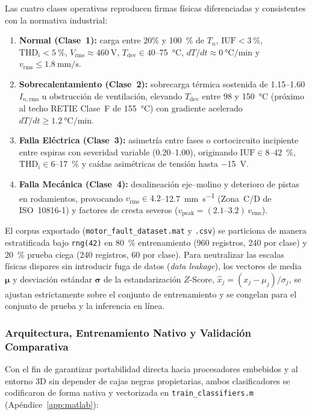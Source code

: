 Las cuatro clases operativas reproducen firmas físicas diferenciadas y consistentes con la normativa industrial:
\begin{enumerate}\setlength{\itemsep}{1.5pt}\setlength{\topsep}{2pt}
    \item \textbf{Normal (Clase~1):} carga entre \num{20}\% y \qty{100}{\percent} de $T_n$, $\text{IUF}<\qty{3}{\percent}$, $\text{THD}_i<\qty{5}{\percent}$, $V_{\text{rms}}\approx\qty{460}{\volt}$, $T_{\text{dev}}\in\num{40}$--\qty{75}{\celsius}, $dT/dt\approx\qty{0}{\celsius\per\minute}$ y $v_{\text{rms}}\le\qty{1.8}{\milli\meter\per\second}$.
    \item \textbf{Sobrecalentamiento (Clase~2):} sobrecarga térmica sostenida de \num{1.15}--\num{1.60}\,$I_{n,\text{rms}}$ u obstrucción de ventilación, elevando $T_{\text{dev}}$ entre \num{98} y \qty{150}{\celsius} (próximo al techo RETIE Clase~F de \qty{155}{\celsius}) con gradiente acelerado $dT/dt\ge\qty{1.2}{\celsius\per\minute}$.
    \item \textbf{Falla Eléctrica (Clase~3):} asimetría entre fases o cortocircuito incipiente entre espiras con severidad variable (\num{0.20}--\num{1.00}), originando $\text{IUF}\in\num{8}$--\qty{42}{\percent}, $\text{THD}_i\in\num{6}$--\qty{17}{\percent} y caídas asimétricas de tensión hasta \qty{-15}{\volt}.
    \item \textbf{Falla Mecánica (Clase~4):} desalineación eje--molino y deterioro de pistas en rodamientos, provocando $v_{\text{rms}}\in\num{4.2}$--\qty{12.7}{\milli\meter\per\second} (Zona~C/D de ISO~10816-1) y factores de cresta severos ($v_{\text{peak}}=(2.1\text{--}3.2)\,v_{\text{rms}}$).
\end{enumerate}

El corpus exportado (\texttt{motor\_\allowbreak fault\_\allowbreak dataset.mat} y \texttt{.csv}) se particiona de manera estratificada bajo \texttt{rng(42)} en \qty{80}{\percent} entrenamiento (\num{960} registros, \num{240} por clase) y \qty{20}{\percent} prueba ciega (\num{240} registros, \num{60} por clase). Para neutralizar las escalas físicas dispares sin introducir fuga de datos (\emph{data leakage}), los vectores de media $\boldsymbol{\mu}$ y desviación estándar $\boldsymbol{\sigma}$ de la estandarización $Z$-Score, $\hat{x}_j = (x_j-\mu_j)/\sigma_j$, se ajustan estrictamente sobre el conjunto de entrenamiento y se congelan para el conjunto de prueba y la inferencia en línea.

\subsubsection{Arquitectura, Entrenamiento Nativo y Validación Comparativa}
Con el fin de garantizar portabilidad directa hacia procesadores embebidos y al entorno 3D sin depender de cajas negras propietarias, ambos clasificadores se codificaron de forma nativa y vectorizada en \texttt{train\_\allowbreak classifiers.m} (Apéndice~\ref{app:matlab}):

